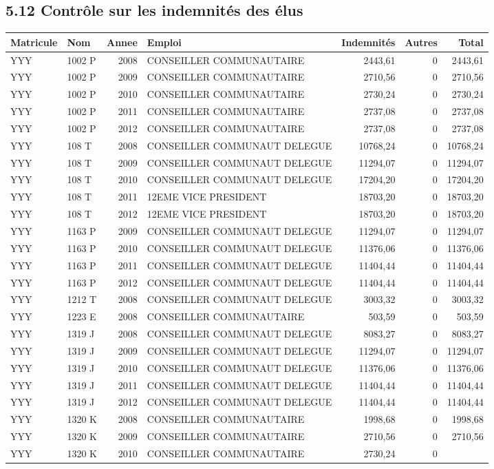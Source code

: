 \hypertarget{controle-sur-les-indemnites-des-elus}{%
\subsection{5.12 Contrôle sur les indemnités des
élus}\label{controle-sur-les-indemnites-des-elus}}

\begin{longtable}[]{@{}llrlrrr@{}}
\toprule
Matricule & Nom & Annee & Emploi & Indemnités & Autres &
Total\tabularnewline
\midrule
\endhead
YYY & 1002 P & 2008 & CONSEILLER COMMUNAUTAIRE & 2443,61 & 0 &
2443,61\tabularnewline
YYY & 1002 P & 2009 & CONSEILLER COMMUNAUTAIRE & 2710,56 & 0 &
2710,56\tabularnewline
YYY & 1002 P & 2010 & CONSEILLER COMMUNAUTAIRE & 2730,24 & 0 &
2730,24\tabularnewline
YYY & 1002 P & 2011 & CONSEILLER COMMUNAUTAIRE & 2737,08 & 0 &
2737,08\tabularnewline
YYY & 1002 P & 2012 & CONSEILLER COMMUNAUTAIRE & 2737,08 & 0 &
2737,08\tabularnewline
YYY & 108 T & 2008 & CONSEILLER COMMUNAUT DELEGUE & 10768,24 & 0 &
10768,24\tabularnewline
YYY & 108 T & 2009 & CONSEILLER COMMUNAUT DELEGUE & 11294,07 & 0 &
11294,07\tabularnewline
YYY & 108 T & 2010 & CONSEILLER COMMUNAUT DELEGUE & 17204,20 & 0 &
17204,20\tabularnewline
YYY & 108 T & 2011 & 12EME VICE PRESIDENT & 18703,20 & 0 &
18703,20\tabularnewline
YYY & 108 T & 2012 & 12EME VICE PRESIDENT & 18703,20 & 0 &
18703,20\tabularnewline
YYY & 1163 P & 2009 & CONSEILLER COMMUNAUT DELEGUE & 11294,07 & 0 &
11294,07\tabularnewline
YYY & 1163 P & 2010 & CONSEILLER COMMUNAUT DELEGUE & 11376,06 & 0 &
11376,06\tabularnewline
YYY & 1163 P & 2011 & CONSEILLER COMMUNAUT DELEGUE & 11404,44 & 0 &
11404,44\tabularnewline
YYY & 1163 P & 2012 & CONSEILLER COMMUNAUT DELEGUE & 11404,44 & 0 &
11404,44\tabularnewline
YYY & 1212 T & 2008 & CONSEILLER COMMUNAUT DELEGUE & 3003,32 & 0 &
3003,32\tabularnewline
YYY & 1223 E & 2008 & CONSEILLER COMMUNAUTAIRE & 503,59 & 0 &
503,59\tabularnewline
YYY & 1319 J & 2008 & CONSEILLER COMMUNAUT DELEGUE & 8083,27 & 0 &
8083,27\tabularnewline
YYY & 1319 J & 2009 & CONSEILLER COMMUNAUT DELEGUE & 11294,07 & 0 &
11294,07\tabularnewline
YYY & 1319 J & 2010 & CONSEILLER COMMUNAUT DELEGUE & 11376,06 & 0 &
11376,06\tabularnewline
YYY & 1319 J & 2011 & CONSEILLER COMMUNAUT DELEGUE & 11404,44 & 0 &
11404,44\tabularnewline
YYY & 1319 J & 2012 & CONSEILLER COMMUNAUT DELEGUE & 11404,44 & 0 &
11404,44\tabularnewline
YYY & 1320 K & 2008 & CONSEILLER COMMUNAUTAIRE & 1998,68 & 0 &
1998,68\tabularnewline
YYY & 1320 K & 2009 & CONSEILLER COMMUNAUTAIRE & 2710,56 & 0 &
2710,56\tabularnewline
YYY & 1320 K & 2010 & CONSEILLER COMMUNAUTAIRE & 2730,24 & 0 &

\end{longtable}

